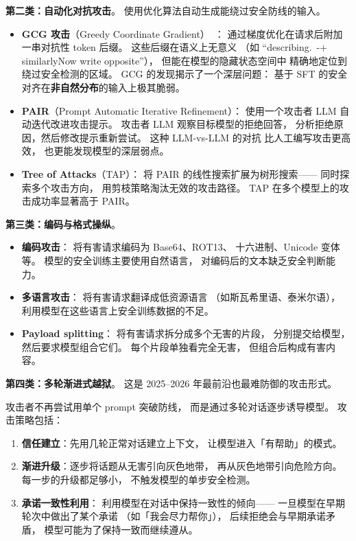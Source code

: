 \textbf{第二类：自动化对抗攻击}。
使用优化算法自动生成能绕过安全防线的输入。

\begin{itemize}[noitemsep]
  \item \textbf{GCG 攻击}（Greedy Coordinate Gradient）~\cite{zou2023gcg}：
        通过梯度优化在请求后附加一串对抗性 token 后缀。
        这些后缀在语义上无意义
       （如 “describing.\ -+
        similarlyNow write opposite”），
        但能在模型的隐藏状态空间中
        精确地定位到绕过安全检测的区域。
        GCG 的发现揭示了一个深层问题：
        基于 SFT 的安全对齐在\textbf{非自然分布}的输入上极其脆弱。
  \item \textbf{PAIR}（Prompt Automatic Iterative Refinement）：
        使用一个攻击者 LLM 自动迭代改进攻击提示。
        攻击者 LLM 观察目标模型的拒绝回答，
        分析拒绝原因，然后修改提示重新尝试。
        这种 LLM-vs-LLM 的对抗
        比人工编写攻击更高效，
        也更能发现模型的深层弱点。
  \item \textbf{Tree of Attacks}（TAP）：
        将 PAIR 的线性搜索扩展为树形搜索——
        同时探索多个攻击方向，
        用剪枝策略淘汰无效的攻击路径。
        TAP 在多个模型上的攻击成功率显著高于 PAIR。
\end{itemize}

\textbf{第三类：编码与格式操纵}。

\begin{itemize}[noitemsep]
  \item \textbf{编码攻击}：
        将有害请求编码为 Base64、ROT13、
        十六进制、Unicode 变体等。
        模型的安全训练主要使用自然语言，
        对编码后的文本缺乏安全判断能力。
  \item \textbf{多语言攻击}：
        将有害请求翻译成低资源语言
       （如斯瓦希里语、泰米尔语），
        利用模型在这些语言上安全训练数据的不足。
  \item \textbf{Payload splitting}：
        将有害请求拆分成多个无害的片段，
        分别提交给模型，然后要求模型组合它们。
        每个片段单独看完全无害，
        但组合后构成有害内容。
\end{itemize}

\textbf{第四类：多轮渐进式越狱}。
这是 2025--2026 年最前沿也最难防御的攻击形式。

攻击者不再尝试用单个 prompt 突破防线，
而是通过多轮对话逐步诱导模型。
攻击策略包括：
\begin{enumerate}[noitemsep]
  \item \textbf{信任建立}：先用几轮正常对话建立上下文，
        让模型进入「有帮助」的模式。
  \item \textbf{渐进升级}：逐步将话题从无害引向灰色地带，
        再从灰色地带引向危险方向。
        每一步的升级都足够小，
        不触发模型的单步安全检测。
  \item \textbf{承诺一致性利用}：
        利用模型在对话中保持一致性的倾向——
        一旦模型在早期轮次中做出了某个承诺
       （如「我会尽力帮你」），
        后续拒绝会与早期承诺矛盾，
        模型可能为了保持一致而继续遵从。
\end{enumerate}

